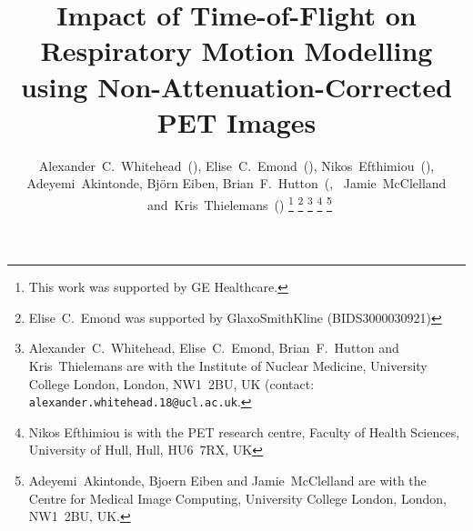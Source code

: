 \documentclass[9pt]{IEEEtran}
\begin{document}
%
\title{Impact of Time-of-Flight on Respiratory Motion Modelling using Non-Attenuation-Corrected PET Images}
%
%
%

\author{Alexander~C.~Whitehead~(),
        Elise~C.~Emond~(),
        Nikos~Efthimiou~(),
        Adeyemi~Akintonde,
        Bj{\"o}rn Eiben,
        Brian~F.~Hutton~(,
        ~Jamie~McClelland
        ~and~Kris~Thielemans~()%
\thanks{This work was supported by GE Healthcare.}%
\thanks{Elise~C.~Emond was supported by GlaxoSmithKline (BIDS3000030921)}
\thanks{Alexander~C.~Whitehead, Elise~C.~Emond, Brian~F.~Hutton and Kris~Thielemans are with the Institute of Nuclear Medicine, University College London, London, NW1~2BU, UK (contact: \texttt{alexander.whitehead.18@ucl.ac.uk}.}%
\thanks{Nikos Efthimiou is with the PET research centre, Faculty of Health Sciences, University of Hull, Hull, HU6~7RX, UK}%
\thanks{Adeyemi~Akintonde, Bjoern Eiben and Jamie~McClelland are with the Centre for Medical Image Computing, University College London, London, NW1~2BU, UK.}%
}

% 
%
\end{document}
